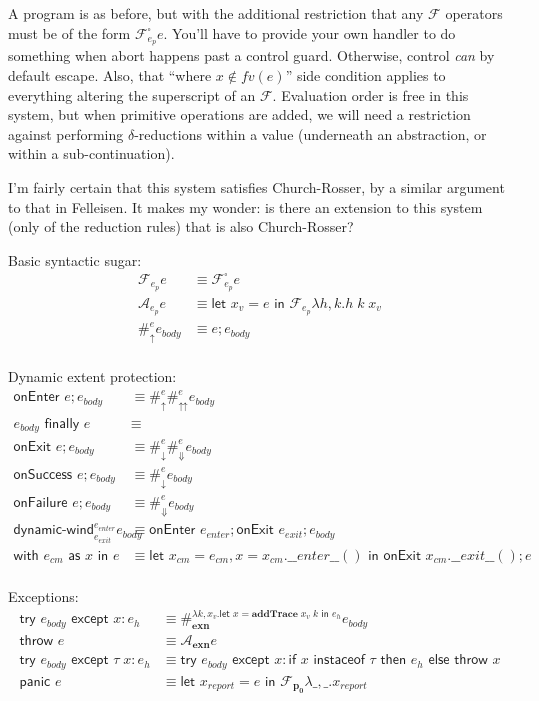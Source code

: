 \documentclass[11pt]{article}
\newcommand{\letin}[2]{\textsf{let }#1\textsf{ in }#2}
\newcommand\F{\mathcal{F}}
\begin{document}
A program is as before, but with the additional restriction that any $\F$ operators must be of the form $\F^\square_{e_p}e$.
You'll have to provide your own handler to do something when abort happens past a control guard. Otherwise, control \emph{can} by default escape.
Also, that ``where $x \notin fv(e)$'' side condition applies to everything altering the superscript of an $\F$.
Evaluation order is free in this system, but when primitive operations are added, we will need a restriction against performing $\delta$-reductions within a value (underneath an abstraction, or within a sub-continuation).

I'm fairly certain that this system satisfies Church-Rosser, by a similar argument to that in Felleisen.
It makes my wonder: is there an extension to this system (only of the reduction rules) that is also Church-Rosser?

Basic syntactic sugar:
\begin{align*}
\F_{e_p}e &\equiv \F_{e_p}^\square e \\
\mathcal A_{e_p}e &\equiv
	\letin{x_v=e}{\F_{e_p}\lambda h,k.h\;k\;x_v}
	\\
\#_\uparrow^ee_{body} &\equiv
	e; e_{body}
	\\
\end{align*}

Dynamic extent protection:
\begin{align*}
\textsf{onEnter }e; e_{body} &\equiv
	\#_\uparrow^e\#_\upuparrows^ee_{body}
	\\
e_{body}\textsf{ finally }e &\equiv \\
	\textsf{onExit }e; e_{body} &\equiv
	\#_\downarrow^e\#_\Downarrow^ee_{body}
	\\
\textsf{onSuccess }e; e_{body} &\equiv
	\#_\downarrow^ee_{body}
	\\
\textsf{onFailure }e; e_{body} &\equiv
	\#_\Downarrow^ee_{body}
	\\
\textsf{dynamic-wind}^{e_{enter}}_{e_{exit}}e_{body} &\equiv
	\textsf{onEnter }e_{enter}; \textsf{onExit }e_{exit}; e_{body}
	\\
\textsf{with }e_{cm}\textsf{ as }x\textsf{ in }e &\equiv
	\letin{x_{cm}=e_{cm},x=x_{cm}.\_\_enter\_\_()}{\textsf{onExit }x_{cm}.\_\_exit\_\_(); e}
	\\
\end{align*}

Exceptions:
\begin{align*}
\textsf{try }e_{body}\textsf{ except }x:e_h &\equiv
	\#_\textbf{exn}^{\lambda k,x_v.\letin{x=\textbf{addTrace}\;x_v\;k}{e_h}}e_{body}
	\\
\textsf{throw }e &\equiv
	\mathcal A_\textbf{exn}e
	\\
\textsf{try }e_{body}\textsf{ except }\tau\;x:e_h &\equiv
	\textsf{try }e_{body}\textsf{ except }x:
		\textsf{if }x\textsf{ instaceof }\tau
		\textsf{ then }e_h
		\textsf{ else throw }x
	\\
\textsf{panic }e &\equiv
	\letin{x_{report} = e}{\F_\mathbf{p_0}\lambda \_,\_.x_{report}}
	\\
\end{align*}
\end{document}
